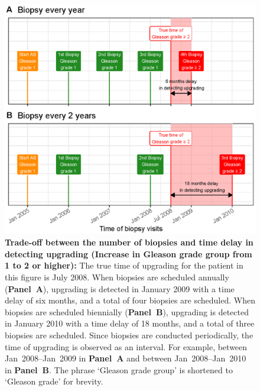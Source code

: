 \begin{figure}
\centerline{\includegraphics[width=\columnwidth]{images/delay_explanation.eps}}
\caption{\textbf{Trade-off between the number of biopsies and time delay in detecting upgrading (Increase in Gleason grade group from 1 to 2 or higher):} The true time of upgrading for the patient in this figure is July 2008. When biopsies are scheduled annually (\textbf{Panel~A}), upgrading is detected in January 2009 with a time delay of six months, and a total of four biopsies are scheduled. When biopsies are scheduled biennially (\textbf{Panel~B}), upgrading is detected in January 2010 with a time delay of 18 months, and a total of three biopsies are scheduled. Since biopsies are conducted periodically, the time of upgrading is observed as an interval. For example, between Jan~2008--Jan~2009 in \textbf{Panel~A} and between Jan~2008--Jan~2010 in \textbf{Panel~B}. The phrase `Gleason grade group' is shortened to `Gleason grade' for brevity.}
\label{fig:delay_explanation}
\end{figure}

